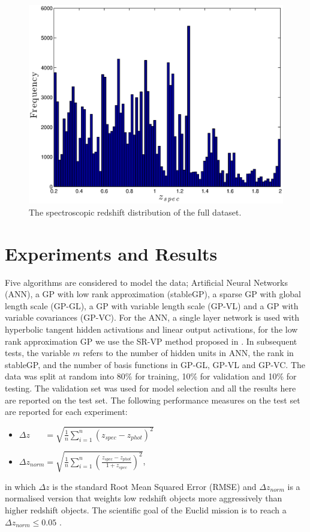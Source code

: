 \documentclass[useAMS,usenatbib,fleqn]{mn2e}
\begin{document}
\begin{figure}
       \centering
       \includegraphics[width=\columnwidth]{figures/zspec.eps}
        \caption{The spectroscopic redshift distribution of the full dataset.}
       \label{fig-zspec-hostogram}
\end{figure}

\section{Experiments and Results}
\label{sec-experiments}

Five algorithms are considered to model the data; Artificial Neural Networks (ANN), a GP with low rank approximation (stableGP), a sparse GP with global length scale (GP-GL), a GP with variable length scale (GP-VL) and a GP with variable covariances (GP-VC). For the ANN, a single layer network is used with hyperbolic tangent hidden activations and linear output activations, for the low rank approximation GP we use the SR-VP method proposed in \citep{foster2009}. In subsequent tests, the variable $m$ refers to the number of hidden units in ANN, the rank in stableGP, and the number of basis functions in GP-GL, GP-VL and GP-VC. The data was split at random into 80\% for training, 10\% for validation and 10\% for testing. The validation set was used for model selection and all the results here are reported on the test set. The following performance measures on the test set are reported for each experiment:
\begin{itemize}
  \item $\Delta z_{\phantom{norm}} = \sqrt{\frac{1}{n}\sum_{i=1}^{n}\left(z_{spec}-z_{phot}\right)^{2}}$
  \item $\Delta z_{norm} = \sqrt{\frac{1}{n}\sum_{i=1}^{n}\left(\frac{z_{spec}-z_{phot}}{1+z_{spec}}\right)^{2}}$,
\end{itemize}
in which $\Delta z$ is the standard Root Mean Squared Error (RMSE) and $\Delta z_{norm}$ is a normalised version that weights low redshift objects more aggressively than higher redshift objects. The scientific goal of the Euclid mission is to reach a $\Delta z_{norm} \le 0.05$ \citep{laureijs2011}.
\end{document}

